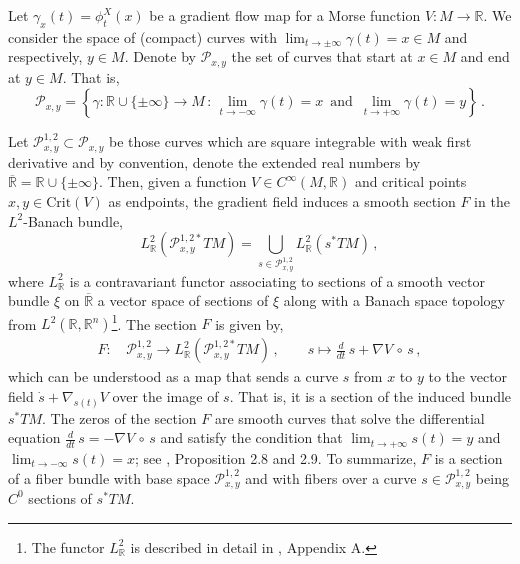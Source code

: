 \documentclass[12pt]{article}
\begin{document}
Let ${\gamma_x(t) = \phi^X_t(x)}$ be a gradient flow map for a Morse function $V: M \rightarrow \mathbb{R}$. We consider the space of (compact) curves with $\lim_{t \rightarrow \pm \infty} \gamma(t) = x \in M$ and respectively, $y \in M$. Denote by $\mathcal{P}_{x,y}$ the set of curves that start at $x \in M$ and end at $y \in M$. That is,
\begin{equation*}
    \mathcal{P}_{x,y} = \left\{ \gamma : \mathbb{R} \cup \{\pm \infty\} \rightarrow M \, : \,  \lim_{t \rightarrow -\infty} \gamma(t) = x \, \text{ and } \, \lim_{t \rightarrow +\infty} \gamma(t) = y \right\} \,.
\end{equation*}

Let $\mathcal{P}^{1,2}_{x,y} \subset \mathcal{P}_{x,y}$ be those curves which are square integrable with weak first derivative and by convention, denote the extended real numbers by $\overline{\mathbb{R}} = \mathbb{R} \cup \{\pm \infty\}$. Then, given a function $V \in C^{\infty}(M,\mathbb{R})$ and critical points $x, y \in \text{Crit}(V)$ as endpoints, the gradient field induces a smooth section $F$ in the $L^2$-Banach bundle,
\begin{equation*}
    L^2_{\mathbb{R}} \left(\mathcal{P}^{1,2*}_{x,y} TM\right) = \bigcup_{s \in \mathcal{P}^{1,2}_{x,y}} L^2_{\mathbb{R}}(s^{*}TM) \, ,
\end{equation*}
where $L^2_{\mathbb{R}}$ is a contravariant functor associating to sections of a smooth vector bundle $\xi$ on $\overline{\mathbb{R}}$ a vector space of sections of $\xi$ along with a Banach space topology from $L^2(\mathbb{R}, \mathbb{R}^n)$\footnote{The functor $L^2_{\mathbb{R}}$ is described in detail in \cite{schwarz1993morse}, Appendix A.}. The section $F$ is given by,
\begin{align*}
    F: & \,\mathcal{P}^{1,2}_{x,y} \rightarrow L^2_{\mathbb{R}} \left(\mathcal{P}^{1,2*}_{x,y} TM\right) \, ,\qquad  s \mapsto \frac{d}{dt} \, s + \nabla V \, \circ \, s \, ,
\end{align*}
which can be understood as a map that sends a curve $s$ from $x$ to $y$ to the vector field $\dot{s} + \nabla_{s(t)} V$ over the image of $s$. That is, it is a section of the induced bundle $s^* TM$. The zeros of the section $F$ are smooth curves that solve the differential equation ${\frac{d}{dt} \, s = -\nabla V \, \circ \, s}$ and satisfy the condition that $\lim_{t\rightarrow + \infty}s(t) = y$ and $\lim_{t\rightarrow - \infty}s(t) = x$; see \cite{schwarz1993morse}, Proposition 2.8 and 2.9. To summarize, $F$ is a section of a fiber bundle with base space $\mathcal{P}^{1,2}_{x,y}$ and with fibers over a curve $s \in \mathcal{P}^{1,2}_{x,y}$ being $C^{0}$ sections of $s^{*}TM$.
\end{document}
